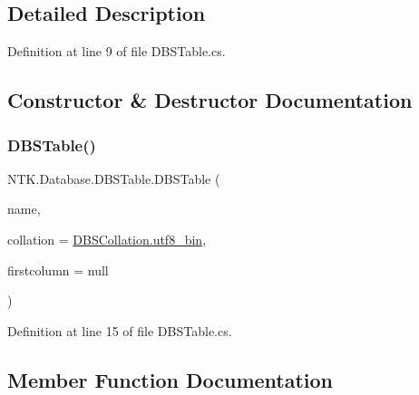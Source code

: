 \subsection{Detailed Description}


Definition at line 9 of file D\+B\+S\+Table.\+cs.



\subsection{Constructor \& Destructor Documentation}
\mbox{\label{class_n_t_k_1_1_database_1_1_d_b_s_table_ad835c6390e9f69dfe446eb7485f77b36}} 
\subsubsection{\texorpdfstring{DBSTable()}{DBSTable()}}
{\footnotesize\ttfamily N\+T\+K.\+Database.\+D\+B\+S\+Table.\+D\+B\+S\+Table (\begin{DoxyParamCaption}\item[{String}]{name,  }\item[{\mbox{\hyperlink{namespace_n_t_k_1_1_database_aa31c221c4926a0f02117557ca9883c03}{D\+B\+S\+Collation}}}]{collation = {\ttfamily \mbox{\hyperlink{namespace_n_t_k_1_1_database_aa31c221c4926a0f02117557ca9883c03a4fad0ebc37542e51064c07c063f2abc2}{D\+B\+S\+Collation.\+utf8\+\_\+bin}}},  }\item[{\mbox{\hyperlink{class_n_t_k_1_1_database_1_1_d_b_s_column}{D\+B\+S\+Column}}}]{firstcolumn = {\ttfamily null} }\end{DoxyParamCaption})}



Definition at line 15 of file D\+B\+S\+Table.\+cs.



\subsection{Member Function Documentation}
\mbox{\label{class_n_t_k_1_1_database_1_1_d_b_s_table_a9bda08190c6cc7146481f81ac781410e}} 
